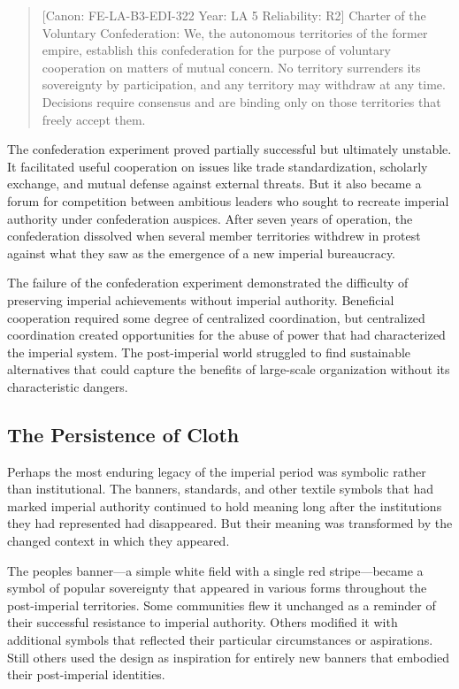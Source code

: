 \begin{quote}
{[}Canon: FE-LA-B3-EDI-322 \textbar{} Year: LA 5 \textbar{} Reliability:
R2{]} Charter of the Voluntary Confederation: We, the autonomous
territories of the former empire, establish this confederation for the
purpose of voluntary cooperation on matters of mutual concern. No
territory surrenders its sovereignty by participation, and any territory
may withdraw at any time. Decisions require consensus and are binding
only on those territories that freely accept them.
\end{quote}

The confederation experiment proved partially successful but ultimately
unstable. It facilitated useful cooperation on issues like trade
standardization, scholarly exchange, and mutual defense against external
threats. But it also became a forum for competition between ambitious
leaders who sought to recreate imperial authority under confederation
auspices. After seven years of operation, the confederation dissolved
when several member territories withdrew in protest against what they
saw as the emergence of a new imperial bureaucracy.

The failure of the confederation experiment demonstrated the difficulty
of preserving imperial achievements without imperial authority.
Beneficial cooperation required some degree of centralized coordination,
but centralized coordination created opportunities for the abuse of
power that had characterized the imperial system. The post-imperial
world struggled to find sustainable alternatives that could capture the
benefits of large-scale organization without its characteristic dangers.

\subsection{The Persistence of Cloth}\label{the-persistence-of-cloth}

Perhaps the most enduring legacy of the imperial period was symbolic
rather than institutional. The banners, standards, and other textile
symbols that had marked imperial authority continued to hold meaning
long after the institutions they had represented had disappeared. But
their meaning was transformed by the changed context in which they
appeared.

The people\textquotesingle s banner---a simple white field with a single
red stripe---became a symbol of popular sovereignty that appeared in
various forms throughout the post-imperial territories. Some communities
flew it unchanged as a reminder of their successful resistance to
imperial authority. Others modified it with additional symbols that
reflected their particular circumstances or aspirations. Still others
used the design as inspiration for entirely new banners that embodied
their post-imperial identities.

